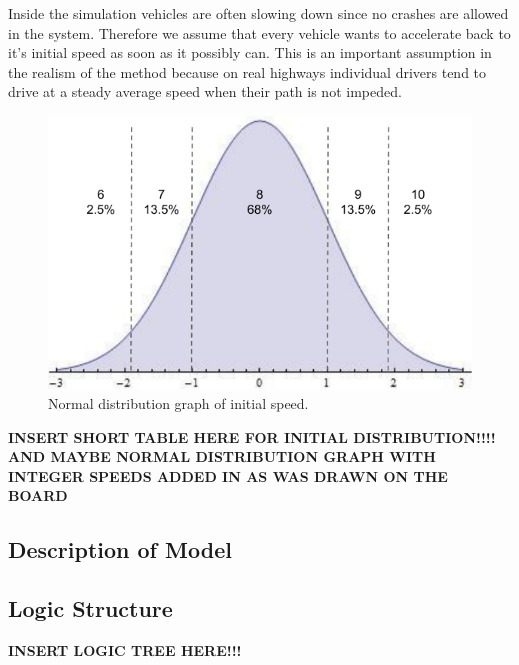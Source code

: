\documentclass{amsart}
\begin{document}
	Inside the simulation vehicles are often slowing down since no crashes are allowed in the system.  Therefore we assume that every vehicle wants to accelerate back to it's initial speed as soon as it possibly can.  This is an important assumption in the realism of the method because on real highways individual drivers tend to drive at a steady average speed when their path is not impeded.  
	
	\begin{figure}[h]
\begin{center}
\includegraphics[scale=0.65]{MCM-speedsnormaldist}
\caption{Normal distribution graph of initial speed.}
\renewcommand{\figurename}{}
\end{center}
\end{figure}
	
	\textbf{INSERT SHORT TABLE HERE FOR INITIAL DISTRIBUTION!!!! AND MAYBE NORMAL DISTRIBUTION GRAPH WITH INTEGER SPEEDS ADDED IN AS WAS DRAWN ON THE BOARD}  
	
	\subsection{Description of Model}
	
	
	\subsection{Logic Structure}
	
	\textbf{INSERT LOGIC TREE HERE!!!}
	
\end{document}
